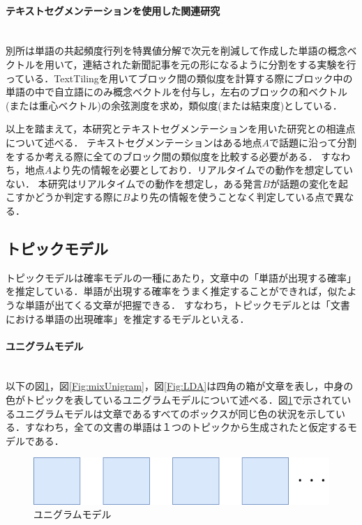 \paragraph{テキストセグメンテーションを使用した関連研究}\ \\
別所\cite{textSegmentation1}は単語の共起頻度行列を特異値分解で次元を削減して作成した単語の概念ベクトルを用いて，連結された新聞記事を元の形になるように分割をする実験を行っている．TextTilingを用いてブロック間の類似度を計算する際にブロック中の単語の中で自立語にのみ概念ベクトルを付与し，左右のブロックの和ベクトル(または重心ベクトル)の余弦測度を求め，類似度(または結束度)としている．

以上を踏まえて，本研究とテキストセグメンテーションを用いた研究との相違点について述べる．
テキストセグメンテーションはある地点$A$で話題に沿って分割をするか考える際に全てのブロック間の類似度を比較する必要がある．
すなわち，地点$A$より先の情報を必要としており．リアルタイムでの動作を想定していない．
本研究はリアルタイムでの動作を想定し，ある発言$B$が話題の変化を起こすかどうか判定する際に$B$より先の情報を使うことなく判定している点で異なる．
%
\subsection{トピックモデル}
トピックモデル\cite{topicModel}は確率モデルの一種にあたり，文章中の「単語が出現する確率」を推定している．単語が出現する確率をうまく推定することができれば，似たような単語が出てくる文章が把握できる．
すなわち，トピックモデルとは「文書における単語の出現確率」を推定するモデルといえる．
\paragraph{ユニグラムモデル}\ \\
以下の図\ref{Fig:unigram}，図\ref{Fig:mixUnigram}，図\ref{Fig:LDA}は四角の箱が文章を表し，中身の色がトピックを表しているユニグラムモデルについて述べる．図\ref{Fig:unigram}で示されているユニグラムモデルは文章であるすべてのボックスが同じ色の状況を示している．すなわち，全ての文書の単語は１つのトピックから生成されたと仮定するモデルである．
\begin{figure}[htbp]
 \begin{center}
  \includegraphics[width=\textwidth]{../images/2.Related_Work/topicModel-unigram.png}
  \caption{ユニグラムモデル}
  \label{Fig:unigram}
  \vspace{-10pt}
 \end{center}
\end{figure}
